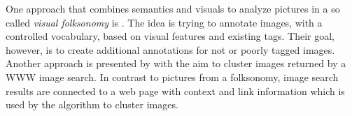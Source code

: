 One approach that combines semantics and visuals to analyze pictures in a so called \emph{visual folksonomy} is \cite{Lindstaedt2009}. The idea is trying to annotate images, with a controlled vocabulary, based on visual features and existing tags. Their goal, however, is to create additional annotations for not or poorly tagged images. \\
Another approach is presented by \cite{cai2004hierarchical} with the aim to cluster images returned by a WWW image search. In contrast to pictures from a folksonomy, image search results are connected to a web page with context and link information which is used by the algorithm to cluster images.
